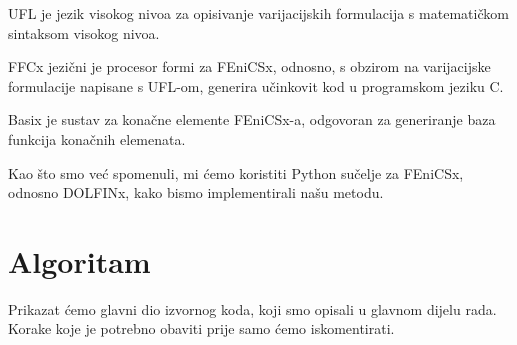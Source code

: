 \documentclass[zavrsnirad]{fer}
\begin{document}
UFL je jezik visokog nivoa za opisivanje varijacijskih formulacija s matematičkom sintaksom visokog nivoa.

FFCx jezični je procesor formi za FEniCSx, odnosno, s obzirom na varijacijske formulacije napisane s UFL-om,
generira učinkovit kod u programskom jeziku C.

Basix je sustav za konačne elemente FEniCSx-a, odgovoran za generiranje baza funkcija konačnih elemenata.

Kao što smo već spomenuli, mi ćemo koristiti Python sučelje za FEniCSx, odnosno DOLFINx, kako bismo implementirali našu metodu.


\section{Algoritam}

Prikazat ćemo glavni dio izvornog koda, koji smo opisali u glavnom dijelu rada.
Korake koje je potrebno obaviti prije samo ćemo iskomentirati.

\renewcommand\thechapter{\arabic{chapter}}
\end{document}
